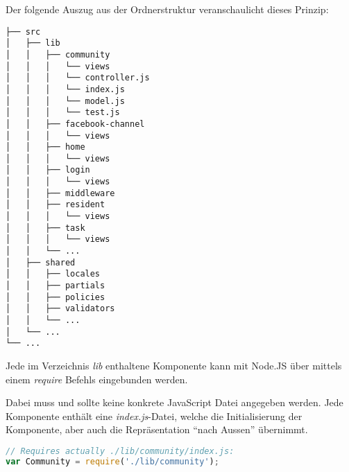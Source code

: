 Der folgende Auszug aus der Ordnerstruktur veranschaulicht dieses Prinzip:
\begin{verbatim}
├── src
│   ├── lib
│   │   ├── community
│   │   │   └── views
│   │   │   └── controller.js
│   │   │   └── index.js
│   │   │   └── model.js
│   │   │   └── test.js
│   │   ├── facebook-channel
│   │   │   └── views
│   │   ├── home
│   │   │   └── views
│   │   ├── login
│   │   │   └── views
│   │   ├── middleware
│   │   ├── resident
│   │   │   └── views
│   │   ├── task
│   │   │   └── views
│   │   └── ...
│   ├── shared
│   │   ├── locales
│   │   ├── partials
│   │   ├── policies
│   │   ├── validators
│   │   └── ...
│   └── ...
└── ...
\end{verbatim}

Jede im Verzeichnis \emph{lib} enthaltene Komponente kann mit Node.JS über mittels einem \emph{require} Befehls eingebunden werden.

Dabei muss und sollte keine konkrete JavaScript Datei angegeben werden. Jede Komponente enthält eine \emph{index.js}-Datei, welche die Initialisierung der Komponente, aber auch die Repräsentation ``nach Aussen'' übernimmt.

\begin{lstlisting}[language=JavaScript, caption=Einbindung der Community-Komponenten]
// Requires actually ./lib/community/index.js:
var Community = require('./lib/community');
\end{lstlisting}
